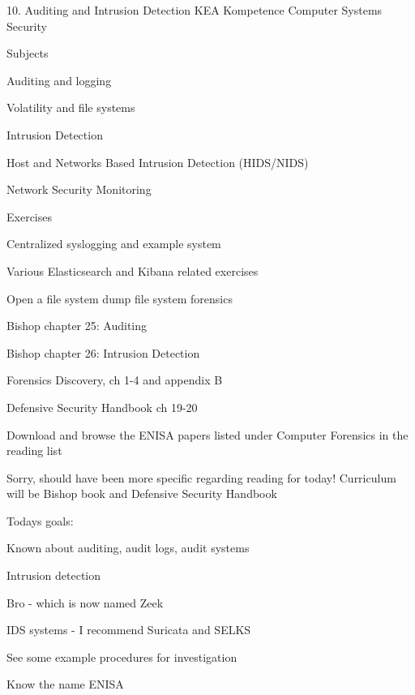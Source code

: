 \documentclass[Screen16to9,17pt]{foils}
\begin{document}
\mytitlepage
{10. Auditing and Intrusion Detection}
{KEA Kompetence Computer Systems Security \the\year}



\begin{list1}
\item Subjects
\begin{list2}
\item Auditing and logging
\item Volatility and file systems
\item Intrusion Detection
\item Host and Networks Based Intrusion Detection (HIDS/NIDS)
\item Network Security Monitoring
\end{list2}
\item Exercises
\begin{list2}
\item Centralized syslogging and example system
\item Various Elasticsearch and Kibana related exercises
\item Open a file system dump file system forensics
\end{list2}
\end{list1}




\begin{list1}
\item Bishop chapter 25: Auditing
\item Bishop chapter 26: Intrusion Detection
\item Forensics Discovery, ch 1-4 and appendix B
\item Defensive Security Handbook ch 19-20
\item Download and browse the ENISA papers listed under Computer Forensics in the reading list
\end{list1}

Sorry, should have been more specific regarding reading for today! Curriculum will be Bishop book and Defensive Security Handbook


Todays goals:
\begin{list2}
\item Known about auditing, audit logs, audit systems
\item Intrusion detection
\item Bro - which is now named Zeek
\item IDS systems - I recommend Suricata and SELKS
\item See some example procedures for investigation
\item Know the name ENISA
\end{list2}
\end{document}
